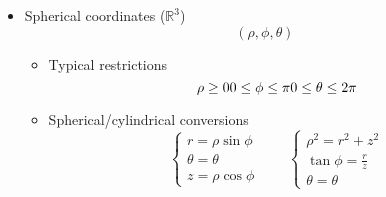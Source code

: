\begin{itemize}
		\item Spherical coordinates ($\mathbb{R}^3$)
			\begin{equation}
				(\rho, \phi, \theta)
			\end{equation}
			\begin{itemize}
				\item Typical restrictions
					\begin{equation}
						\rho \geq 0 \\
						0 \leq \phi \leq \pi \\
						0 \leq \theta \leq 2 \pi
					\end{equation}
				\item Spherical/cylindrical conversions
					\begin{equation}
						\begin{cases}
							r = \rho \sin \phi \\
							\theta = \theta \\
							z = \rho \cos \phi
						\end{cases} \qquad \begin{cases}
							\rho^2 = r^2 + z^2 \\
							\tan \phi = \frac{r}{z} \\
							\theta = \theta
						\end{cases}
					\end{equation}
			\end{itemize}
	\end{itemize}